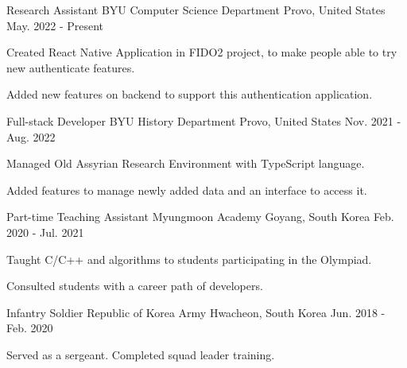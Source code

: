 

\begin{cventries}

  \cventry
  {Research Assistant} %
  {BYU Computer Science Department} %
  {Provo, United States} %
  {May. 2022 - Present} %
  {
    \begin{cvitems} %
      \item {Created React Native Application in FIDO2 project, to make people able to try new authenticate features.}
      \item {Added new features on backend to support this authentication application.}
    \end{cvitems}
  }

  \cventry
  {Full-stack Developer} %
  {BYU History Department} %
  {Provo, United States} %
  {Nov. 2021 - Aug. 2022} %
  {
    \begin{cvitems} %
      \item {Managed Old Assyrian Research Environment with TypeScript language.}
      \item {Added features to manage newly added data and an interface to access it.}
    \end{cvitems}
  }

  \cventry
  {Part-time Teaching Assistant} %
  {Myungmoon Academy} %
  {Goyang, South Korea} %
  {Feb. 2020 - Jul. 2021} %
  {
    \begin{cvitems} %
      \item {Taught C/C++ and algorithms to students participating in the Olympiad.}
      \item {Consulted students with a career path of developers.}
    \end{cvitems}
  }

  \cventry
  {Infantry Soldier} %
  {Republic of Korea Army} %
  {Hwacheon, South Korea} %
  {Jun. 2018 - Feb. 2020} %
  {
    \begin{cvitems} %
      \item {Served as a sergeant. Completed squad leader training.}
    \end{cvitems}
  }

\end{cventries}
